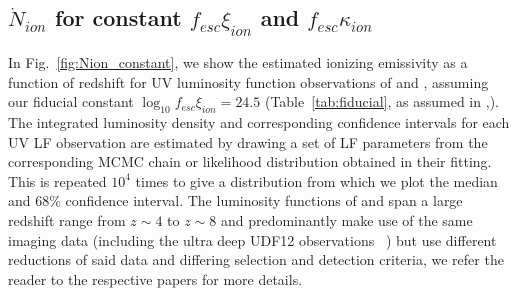 \subsection{$\dot{N}_{ion}$ for constant $f_{esc}\xi_{ion}$ and $f_{esc}\kappa_{ion}$}
In Fig.~\ref{fig:Nion_constant}, we show the estimated ionizing emissivity as a function of redshift for UV luminosity function observations of \citet{Bouwens:2014tx,Finkelstein:2014ub,Oesch:2014cs} and \citet{McLeod:2014wz}, assuming our fiducial constant $\log_{10}f_{esc}\xi_{ion} = 24.5$ (Table~\ref{tab:fiducial}, as assumed in \citeauthor{Robertson:2013ji},\citeyear{Robertson:2013ji}). The integrated luminosity density and corresponding confidence intervals for each UV LF observation are estimated by drawing a set of LF parameters from the corresponding MCMC chain or likelihood distribution obtained in their fitting. This is repeated $10^{4}$ times to give a distribution from which we plot the median and $68\%$ confidence interval. The luminosity functions of \citet{Bouwens:2014tx} and \citet{Finkelstein:2014ub} span a large redshift range from $z\sim4$ to $z\sim8$ and predominantly make use of the same imaging data (including the ultra deep UDF12 observations \citeauthor{Koekemoer:2013db}~\citeyear{Koekemoer:2013db}) but use different reductions of said data and differing selection and detection criteria, we refer the reader to the respective papers for more details. 

